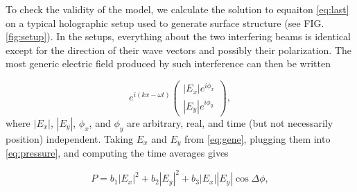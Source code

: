 \documentclass[aps, prl, twocolumn, groupedaddress]{revtex4-1}
\begin{document}
To check the validity of the model, we calculate the solution to
equaiton \ref{eq:last} on a typical holographic setup used to generate
surface structure (see FIG.\ref{fig:setup}).  In the setups,
everything about the two interfering beams is identical except for the
direction of their wave vectors and possibly their polarization. The
most generic electric field produced by such interference can then be
written

\begin{equation}
e^{i\left(kx-\omega t\right)} \left(
\begin{array}{c}
                                                                                                                                                                                                                                                                                                                                                                                                                                                                                                                                \left|E_x\right| e^{i\phi_x}\\
                                                                                                                                                                                                                                                                                                                                                                                                                                                                                                                                \left|E_y\right| e^{i\phi_y}
\end{array}
\right) \mathrm{,} \label{eq:gene}
\end{equation}
where $\left|E_x\right|$, $\left|E_y\right|$, $\phi_x$, and $\phi_y$  are arbitrary,
real, and time (but not necessarily position) independent. Taking $E_x$ and $E_y$ from
\ref{eq:gene}, plugging them into \ref{eq:pressure}, and computing the time averages
gives

\begin{equation}
\label{eq:soln}
P = b_1\left|E_x\right|^2 + b_2\left|E_y\right|^2 +b_3
\left|E_x\right|\left|E_y\right|\cos{\Delta\phi},
\end{equation}
\end{document}
